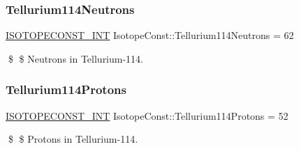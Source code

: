 \subsubsection{\texorpdfstring{Tellurium114\+Neutrons}{Tellurium114Neutrons}}
{\footnotesize\ttfamily \mbox{\hyperlink{group___isotope_const-_macros_ga5f18360b3e99483a35c32d789e62621c}{I\+S\+O\+T\+O\+P\+E\+C\+O\+N\+S\+T\+\_\+\+I\+NT}} Isotope\+Const\+::\+Tellurium114\+Neutrons = 62}

\$ \$ Neutrons in Tellurium-\/114. \mbox{\label{group___isotope_const-_tellurium-_te114_ga5efb931d5a29f8989a1d13e9d89f470d}} 
\subsubsection{\texorpdfstring{Tellurium114\+Protons}{Tellurium114Protons}}
{\footnotesize\ttfamily \mbox{\hyperlink{group___isotope_const-_macros_ga5f18360b3e99483a35c32d789e62621c}{I\+S\+O\+T\+O\+P\+E\+C\+O\+N\+S\+T\+\_\+\+I\+NT}} Isotope\+Const\+::\+Tellurium114\+Protons = 52}

\$ \$ Protons in Tellurium-\/114. 